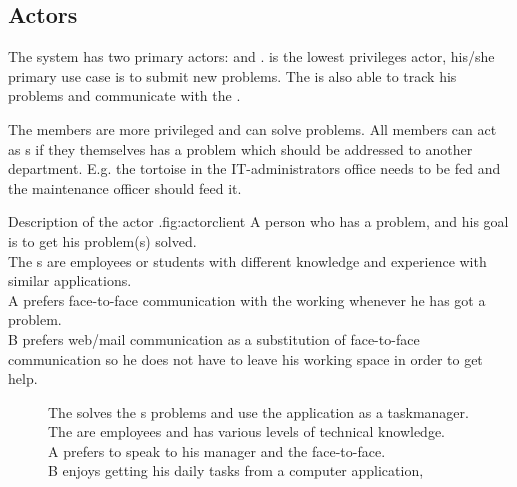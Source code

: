 \subsection{Actors}
\label{sec:actors}

The system has two primary actors:  \aclient{} and \astaff. \aclient[c] is the lowest privileges actor, his/she primary use case is to submit new problems. The \aclient[] is also able to track his problems and communicate with the \astaff[]. 

The \astaff{} members are more privileged and can solve problems. 
All \astaff{} members can act as \aclient{}s if they themselves has a problem which should be addressed to another department. 
E.g. the tortoise in the IT-administrators office needs to be fed and the maintenance officer should feed it. 


\begin{sadlist}[h]{\Aclient}{Description of the actor \aclient.}{fig:actorclient}
 A person who has a problem, and his goal is to get his problem(s) solved. \\
 The \aclient{}s are employees or students with different knowledge and experience with similar applications. \\%
 \Aclient{} A prefers face-to-face communication with the working \astaff{} whenever he has got a problem.\\
\aclient[c] B prefers web/mail communication as a substitution of face-to-face communication so he does not have to leave his working space in order to get help. 
\end{sadlist} 

\begin{figure}[H]
\begin{sadlistar}{\Astaff}
 The \astaff{} solves the \aclient[]s problems and use the application as a taskmanager.  \\
 The \astaff[] are employees and has various levels of technical knowledge. \\
 \astaff[c] A prefers to speak to his manager and the \aclient[] face-to-face.\\
\astaff[c] B enjoys getting his daily tasks from a computer application, 
 \end{sadlistar}
 \caption{}
 \label{fig:actorstaff}
 \end{figure}


